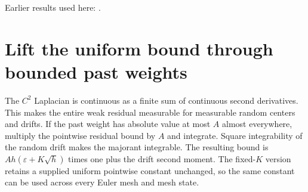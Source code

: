 \documentclass[11pt,a4paper]{article}
\begin{document}
Earlier results used here: \cite[Section~3.55.1]{LangevinLean2026ULASC}.

\section{\texorpdfstring{Lift the uniform bound through bounded past weights}{Lift the uniform bound through bounded past weights}}


The \(C^{2}\) Laplacian is continuous as a finite sum of continuous second derivatives. This makes the entire weak residual measurable for measurable random centers and drifts. If the past weight has absolute value at most \(A\) almost everywhere, multiply the pointwise residual bound by \(A\) and integrate. Square integrability of the random drift makes the majorant integrable. The resulting bound is \(Ah(\varepsilon+K\sqrt h)\) times one plus the drift second moment. The fixed-\(K\) version retains a supplied uniform pointwise constant unchanged, so the same constant can be used across every Euler mesh and mesh state.
\end{document}
